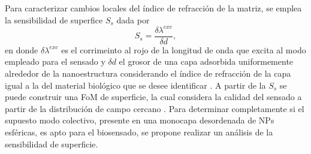 Para caracterizar cambios locales del índice de refracción de la matriz, se emplea la sensibilidad de superfice $S_s$ dada por \cite{estevez2014trends}
%
\begin{equation}
S_s=  \frac{\delta \lambda^{exc}}{\delta d},
\end{equation}
%
en donde $\delta \lambda^{exc}$ es el corrimeinto al rojo de la longitud de onda que excita al modo empleado para el sensado y $\delta d$ el grosor de una capa  adsorbida uniformemente alrededor de la nanoestructura considerando el índice de refracción de la capa igual a la del material biológico que se desee identificar  \cite{estevez2014trends}. A partir de la $S_s$ se puede construir una FoM de superficie, la cual considera la calidad del sensado a partir de la distribución de campo cercano \cite{estevez2014trends,svedendahl2009refractometric}. Para determinar completamente si el supuesto modo colectivo, presente en una monocapa desordenada de NPs esféricas, es apto para el biosensado, se propone realizar un análisis de la  sensibilidad de superficie.


